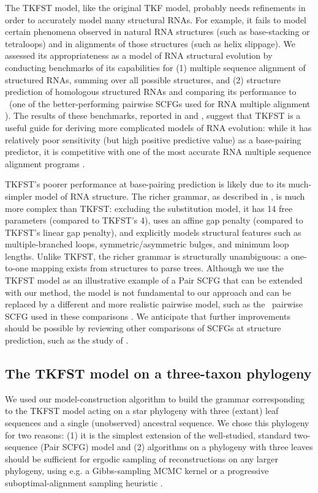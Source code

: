 \documentclass[10pt]{article}
\begin{document}
The TKFST model, like the original TKF model, probably needs
refinements in order to accurately model many structural RNAs.  For
example, it fails to model certain phenomena observed in natural
RNA structures (such as base-stacking or tetraloops) and in alignments
of those structures (such as helix slippage).
We assessed its appropriateness as a model of RNA structural evolution
by conducting benchmarks of its capabilities for (1) multiple sequence
alignment of structured RNAs, summing over all possible structures,
and (2) structure prediction of homologous structured RNAs and
comparing its performance to \stemloc\ (one of the better-performing pairwise
SCFGs used for RNA multiple alignment \cite{BradleyPachterHolmes2008}).  The
results of these benchmarks, reported in 
and , suggest that TKFST is a
useful guide for deriving more complicated models of RNA evolution:
while it has relatively poor sensitivity (but high positive predictive
value) as a base-pairing predictor, it is competitive with one of the
most accurate RNA multiple sequence alignment programs \cite{BradleyPachterHolmes2008}.

TKFST's poorer performance at base-pairing prediction is likely
due to its much-simpler model of RNA structure.
The richer grammar, as described in \cite{Holmes2005},
is much more complex than TKFST:
excluding the substitution model, it has 14 free parameters
(compared to TKFST's 4),
uses an affine gap penalty
(compared to TKFST's linear gap penalty),
and explicitly models structural features
such as multiple-branched loops, symmetric/asymmetric bulges, and minimum loop lengths.
Unlike TKFST, the richer grammar is structurally unambiguous:
a one-to-one mapping exists from structures to parse trees.
Although we use the TKFST model as an illustrative example of a Pair
SCFG that can be extended with our method, the model is not
fundamental to our approach and can be replaced by a different
and more realistic pairwise model, such as the \stemloc\ pairwise SCFG used in 
these comparisons \cite{BradleyPachterHolmes2008}.
We anticipate that further improvements should be possible by reviewing
other comparisons of SCFGs at structure prediction,
such as the study of \cite{DowellEddy2004}.


\subsection*{The TKFST model on a three-taxon phylogeny}

We used our model-construction algorithm to build the grammar
corresponding to the TKFST model acting on a star phylogeny with three
(extant) leaf sequences and a single (unobserved) ancestral
sequence. We chose this phylogeny for two reasons: (1) it is the
simplest extension of the well-studied, standard two-sequence (Pair
SCFG) model and (2) algorithms on a phylogeny with three leaves
should be sufficient for ergodic sampling of reconstructions on any larger phylogeny,
using e.g. a Gibbs-sampling MCMC kernel \cite{JensenHein2002}
or a progressive suboptimal-alignment sampling heuristic \cite{PatenHolmesBirney2008}.
\end{document}

